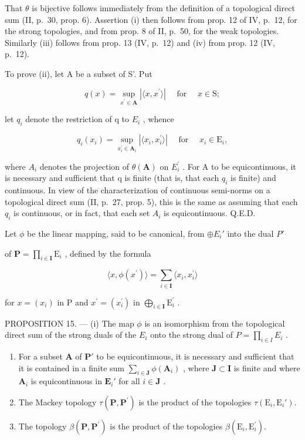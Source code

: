 That \(\theta\) is bijective follows immediately from the definition of a topological direct sum (II, p.~30, prop. 6). Assertion (i) then follows from prop. 12 of IV, p.~12, for the strong topologies, and from prop. 8 of II, p.~50, for the weak topologies. Similarly (iii) follows from prop. 13 (IV, p.~12) and (iv) from prop. 12 (IV, p.~12).

To prove (ii), let A be a subset of S'. Put

\[
q (x) = \sup _ {x ^ {\prime} \in \mathbf {A}} | \langle x, x ^ {\prime} \rangle | \quad \text { for } \quad x \in \mathrm{S};\tag{11}
\]

let \(q_{i}\) denote the restriction of q to \(E_{i}\) , whence

\[
q _ {i} (x _ {i}) = \sup _ {x _ {i} ^ {\prime} \in \mathbf {A} _ {i}} | \langle x _ {i}, x _ {i} ^ {\prime} \rangle | \quad \text { for } \quad x _ {i} \in \mathrm{E} _ {i},\tag{12}
\]

where \(A_{i}\) denotes the projection of \(\theta(\mathbf{A})\) on \(E_{i}^{\prime}\) . For A to be equicontinuous, it is necessary and sufficient that q is finite (that is, that each \(q_{i}\) is finite) and continuous. In view of the characterization of continuous semi-norms on a topological direct sum (II, p.~27, prop. 5), this is the same as assuming that each \(q_{i}\) is continuous, or in fact, that each set \(A_{i}\) is equicontinuous. Q.E.D.

Let \(\phi\) be the linear mapping, said to be canonical, from \(\oplus E_i'\) into the dual \(P'\)

of \(\mathbf{P} = \prod_{i\in \mathbf{I}}\mathrm{E}_i\) , defined by the formula

\[
\langle x, \phi (x ^ {\prime}) \rangle = \sum_ {i \in \mathbf {I}} \langle x _ {i}, x _ {i} ^ {\prime} \rangle\tag{13}
\]

for \(x = (x_{i})\) in \(\mathrm{P}\) and \(x^{\prime} = (x_{i}^{\prime})\) in \(\bigoplus_{i\in \mathbf{I}}\mathrm{E}_{i}^{\prime}\) .

PROPOSITION 15. --- (i) The map \(\phi\) is an isomorphism from the topological direct sum of the strong duals of the \(E_i\) onto the strong dual of \(P = \prod_{i \in I} E_i\) .

\begin{enumerate}
\def\labelenumi{(\roman{enumi})}
\setcounter{enumi}{1}
\item
  For a subset \(\mathbf{A}\) of \(\mathbf{P}'\) to be equicontinuous, it is necessary and sufficient that it is contained in a finite sum \(\sum_{i\in \mathbf{J}}\phi (\mathbf{A}_i)\) , where \(\mathbf{J}\subset \mathbf{I}\) is finite and where \(\mathbf{A}_i\) is equicontinuous in \(\mathbf{E}_i'\) for all \(i\in \mathbf{J}\) .
\item
  The Mackey topology \(\tau (\mathbf{P},\mathbf{P}^{\prime})\) is the product of the topologies \(\tau (\mathrm{E}_i,\mathrm{E}_i')\).
\item
  The topology \(\beta (\mathbf{P},\mathbf{P}^{\prime})\) is the product of the topologies \(\beta (\mathrm{E}_i,\mathrm{E}_i^{\prime})\).
\end{enumerate}

